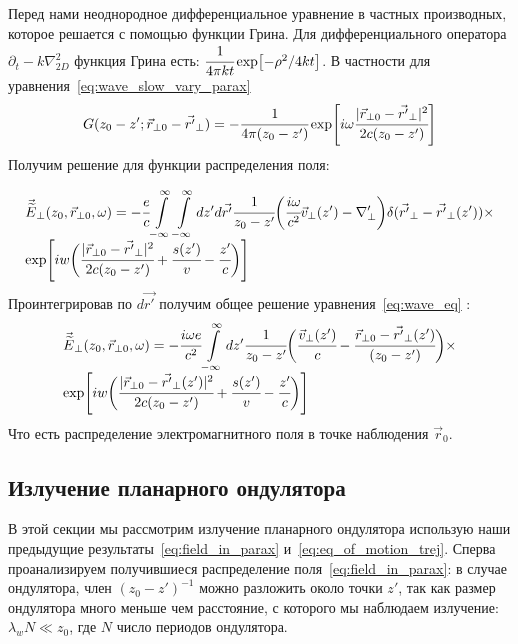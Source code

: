 \documentclass[14pt,a4paper]{extarticle}
\numberwithin{equation}{section}
\begin{document}
Перед нами неоднородное дифференциальное уравнение в частных производных, которое решается с помощью функции Грина. Для дифференциального оператора $\partial_t - k\nabla_{2D}^2$ функция Грина есть: $\cfrac{1}{4\pi kt}\exp[-\rho^2/4kt]$. В частности для уравнения~\ref{eq:wave_slow_vary_parax}
\begin{equation}
	\label{eq:Green_func}
	G(z_0 - z'; \vec{r}_{\bot 0} - \vec{r'}_{\bot}) = 
	- \cfrac{1}{4\pi (z_0 - z')}\exp[i\omega \cfrac{|\vec{r}_{\bot 0} - \vec{r'}_{\bot}|^2}{2c(z_0 - z')}]
\end{equation} 
Получим решение для функции распределения поля:

\begin{equation}
	\begin{array}{lcl}
		\vec{\widetilde{E}}_{\bot}(z_0,  \vec{r}_{\bot 0}, \omega) = -\cfrac{e}{c}  \displaystyle\int\limits_{-\infty}^{\infty}\int\limits_{-\infty}^{\infty} dz'd\vec{r'}\cfrac{1}{z_0 - z'}
		\bigg(\cfrac{i\omega}{c^2}\vec{v}_{\bot}(z')
		-\nabla'_{\bot}\bigg) \delta(\vec{r'}_{\bot} - \vec{r'}_{\bot}(z'))\times\\
		\exp[iw\bigg( \cfrac{|\vec{r}_{\bot 0} - \vec{r'}_{\bot}|^2}{2c(z_0 - z')} +\cfrac{s(z')}{v} - \cfrac{z'}{c} \bigg)]
	\end{array}	
\end{equation}
Проинтегрировав по $d\vec{r'}$ получим общее решение уравнения~\ref{eq:wave_eq} :
\begin{equation}
	\label{eq:field_in_parax}
	\begin{array}{lcl}
		\vec{\widetilde{E}}_{\bot}(z_0,  \vec{r}_{\bot 0}, \omega) = -\cfrac{i\omega e}{c^2}  \displaystyle\int\limits_{-\infty}^{\infty} dz'
		\cfrac{1}{z_0 - z'}
		\bigg(\cfrac{\vec{v}_{\bot}(z')}{c}
		- \cfrac{\vec{r}_{\bot 0} - \vec{r'}_{\bot}(z')}{(z_0 - z')}\bigg)\times\\
		\exp[iw\bigg(\cfrac{|\vec{r}_{\bot 0} - \vec{r'}_{\bot}(z')|^2}{2c(z_0 - z')} + \cfrac{s(z')}{v} - \cfrac{z'}{c} \bigg)]
	\end{array}	
\end{equation}
Что есть распределение электромагнитного поля в точке наблюдения $\vec{r}_0$.

\subsection{Излучение планарного ондулятора}
В этой секции мы рассмотрим излучение планарного ондулятора использую наши предыдущие результаты~\ref{eq:field_in_parax} и~\ref{eq:eq_of_motion_trej}. Сперва проанализируем получившиеся распределение поля~\ref{eq:field_in_parax}: в случае ондулятора, член $(z_0 - z')^{-1}$ можно разложить около точки $z'$, так как размер ондулятора много меньше чем расстояние, с которого мы наблюдаем излучение: $\lambda_w N \ll z_0$, где $N$ число периодов ондулятора.
\end{document}
